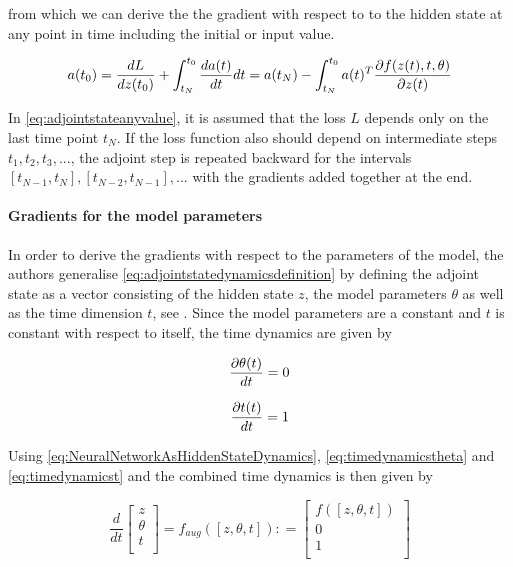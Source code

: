 \documentclass[10pt]{reportMaster}
\begin{document}
from which we can derive the the gradient with respect to to the hidden state at any point in time including the initial or input value. 

\begin{equation}
\label{eq:adjointstateanyvalue}
a(t_{0}) =  \frac{dL}{dz(t_{0})} + \int_{t_{N}}^{t_{0}} \frac{da(t)}{dt}dt = a(t_{N}) -  \int_{t_{N}}^{t_{0}} a(t)^{T} \frac{\partial f(z(t), t, \theta)}{\partial z(t)} \\
\end{equation}

In \ref{eq:adjointstateanyvalue}, it is assumed that the loss $L$ depends only on the last time point $t_{N}$. If the loss function also should depend on intermediate steps $t_{1}, t_{2}, t_{3}, ...$, the adjoint step is repeated backward for the intervals $[t_{N-1}, t_{N}], [t_{N-2}, t_{N-1}], ...$ with the gradients added together at the end. 

\paragraph{Gradients for the model parameters} 

In order to derive the gradients with respect to the parameters of the model, the authors generalise \ref{eq:adjointstatedynamicsdefinition} by defining the adjoint state as a vector consisting of the hidden state $z$, the model parameters $\theta$ as well as the time dimension $t$, see \cite[Appendix B.2]{chen2018neural}. Since the model parameters are a constant and $t$ is constant with respect to itself, the time dynamics are given by 

\begin{equation}
\label{eq:timedynamicstheta}
 \frac{\partial \theta(t)}{dt} = 0 \\
\end{equation}

\begin{equation}
\label{eq:timedynamicst}
 \frac{\partial t(t)}{dt} = 1 \\
\end{equation}

Using  \ref{eq:NeuralNetworkAsHiddenStateDynamics},  \ref{eq:timedynamicstheta} and \ref{eq:timedynamicst} and the combined time dynamics is then given by

\begin{equation}
\label{eq:timedynamicscombinedaugmentedstate}
\frac{d}{dt}
\begin{bmatrix}
z \\
\theta \\
t \\
\end{bmatrix} = f_{aug}([z, \theta, t]) : =
\begin{bmatrix}
f([z, \theta, t]) \\
0 \\
1 \\
\end{bmatrix}
\end{equation}
\end{document}
